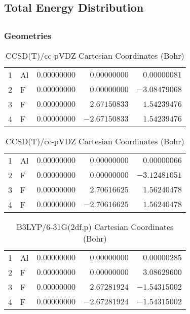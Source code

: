 \documentclass[10pt,oneside]{article}
\begin{document}
\begin{table}
\subsection*{Total Energy Distribution}
\centering\end{table}

\clearpage

\subsection{}

\begin{table}[h!]
\subsubsection*{Geometries}
\begin{multicols}{2}
\centering
\caption{CCSD(T)/cc-pVTZ Cartesian Coordinates (Bohr)}
\begin{tabular}{llrrr}
\toprule
1  & Al & $ 0.00000000$ & $ 0.00000000$ & $ 0.00000081$ \\
2  & F  & $ 0.00000000$ & $ 0.00000000$ & $-3.08479068$ \\
3  & F  & $ 0.00000000$ & $ 2.67150833$ & $ 1.54239476$ \\
4  & F  & $ 0.00000000$ & $-2.67150833$ & $ 1.54239476$ \\
\bottomrule
\end{tabular}
\caption{CCSD(T)/cc-pVDZ Cartesian Coordinates (Bohr)}
\begin{tabular}{llrrr}
\toprule
1  & Al & $ 0.00000000$ & $ 0.00000000$ & $ 0.00000066$ \\
2  & F  & $ 0.00000000$ & $ 0.00000000$ & $-3.12481051$ \\
3  & F  & $ 0.00000000$ & $ 2.70616625$ & $ 1.56240478$ \\
4  & F  & $ 0.00000000$ & $-2.70616625$ & $ 1.56240478$ \\
\bottomrule
\end{tabular}
\end{multicols}
\end{table}

\begin{table}[h]
\centering
\caption{B3LYP/6-31G(2df,p) Cartesian Coordinates (Bohr)}
\begin{tabular}{llrrr}
\toprule
1  & Al & $ 0.00000000$ & $ 0.00000000$ & $ 0.00000285$ \\
2  & F  & $ 0.00000000$ & $ 0.00000000$ & $ 3.08629600$ \\
3  & F  & $ 0.00000000$ & $ 2.67281924$ & $-1.54315002$ \\
4  & F  & $ 0.00000000$ & $-2.67281924$ & $-1.54315002$ \\
\bottomrule
\end{tabular}
\end{table}
\end{document}

